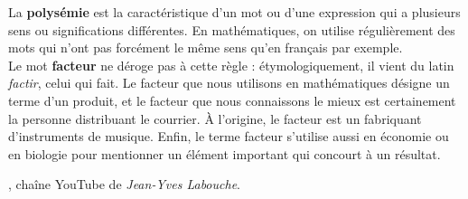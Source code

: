 \begin{changemargin}{-7mm}{-7mm}
    \vspace*{-7mm}
    
    \vspace*{-3mm}
    
    \vspace*{-3mm}
    \begin{debat}
        \vspace*{-7mm}
        La {\bf polysémie} est la caractéristique d'un mot ou d'une expression qui a plusieurs sens ou significations différentes. En mathématiques, on utilise régulièrement des mots qui n'ont pas forcément le même sens qu'en français par exemple. \\
        Le mot {\bf facteur} ne déroge pas à cette règle : étymologiquement, il vient du latin {\it factir}, celui qui fait. Le facteur que nous utilisons en mathématiques désigne un terme d'un produit, et le facteur que nous connaissons le mieux est certainement la personne distribuant le courrier. À l'origine, le facteur est un fabriquant d'instruments de musique. Enfin, le terme facteur s'utilise aussi en économie ou en biologie pour mentionner un élément important qui concourt à un résultat.
        \begin{center}
            \scalebox{0.7}{
                \begin{pspicture}(0,0)(3,2)
                    \psframe[fillstyle=solid,fillcolor=A1!15](0,0)(3,2)
                    \pspolygon[fillstyle=solid,fillcolor=A1!10](0,2)(1.5,0.8)(3,2)
                \end{pspicture}
            }
        \end{center}
        \begin{cadre}[B2][J4]
           \begin{center}
              , chaîne YouTube de {\it Jean-Yves Labouche}.
           \end{center}
        \end{cadre}
     \end{debat}
\end{changemargin}